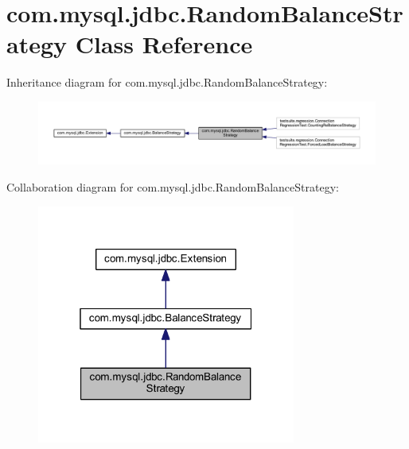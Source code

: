 \hypertarget{classcom_1_1mysql_1_1jdbc_1_1_random_balance_strategy}{}\section{com.\+mysql.\+jdbc.\+Random\+Balance\+Strategy Class Reference}
\label{classcom_1_1mysql_1_1jdbc_1_1_random_balance_strategy}


Inheritance diagram for com.\+mysql.\+jdbc.\+Random\+Balance\+Strategy\+:
\nopagebreak
\begin{figure}[H]
\begin{center}
\leavevmode
\includegraphics[width=350pt]{classcom_1_1mysql_1_1jdbc_1_1_random_balance_strategy__inherit__graph}
\end{center}
\end{figure}


Collaboration diagram for com.\+mysql.\+jdbc.\+Random\+Balance\+Strategy\+:
\nopagebreak
\begin{figure}[H]
\begin{center}
\leavevmode
\includegraphics[width=241pt]{classcom_1_1mysql_1_1jdbc_1_1_random_balance_strategy__coll__graph}
\end{center}
\end{figure}
